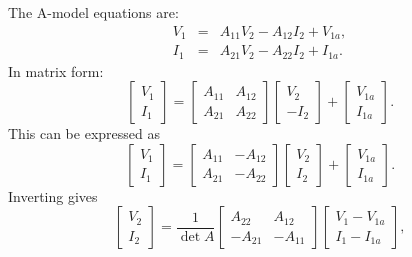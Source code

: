 \documentclass[a4paper, 12pt]{article}
\begin{document}
The A-model equations are:
%
\begin{eqnarray}
  V_1 & = & A_{11} V_2 - A_{12} I_2 + V_{1a}, \\
  I_1 & = & A_{21} V_2 - A_{22} I_2 + I_{1a}.
\end{eqnarray}
%
In matrix form:
%
\begin{equation}
  \begin{bmatrix}
    V_1 \\ I_1
  \end{bmatrix}
  =
  \begin{bmatrix}
    A_{11} & A_{12} \\
    A_{21} & A_{22}
  \end{bmatrix}
  \begin{bmatrix}
    V_2 \\ -I_2
  \end{bmatrix}  
  +
  \begin{bmatrix}
    V_{1a} \\ I_{1a}
  \end{bmatrix}. 
\end{equation}
%
This can be expressed as
%
\begin{equation}
  \begin{bmatrix}
    V_1 \\ I_1
  \end{bmatrix}
  =
  \begin{bmatrix}
    A_{11} & -A_{12} \\
    A_{21} & -A_{22}
  \end{bmatrix}
  \begin{bmatrix}
    V_2 \\ I_2
  \end{bmatrix}  
  +
  \begin{bmatrix}
    V_{1a} \\ I_{1a}
  \end{bmatrix}. 
\end{equation}
%
Inverting gives
%
\begin{equation}
  \begin{bmatrix}
    V_2 \\ I_2
  \end{bmatrix}
  =
  \frac{1}{\det{A}}
  \begin{bmatrix}
    A_{22} & A_{12} \\
    -A_{21} & -A_{11}
  \end{bmatrix}
  \begin{bmatrix}
    V_1 - V_{1a} \\ I_1 - I_{1a}
  \end{bmatrix},
\end{equation}
\end{document}
